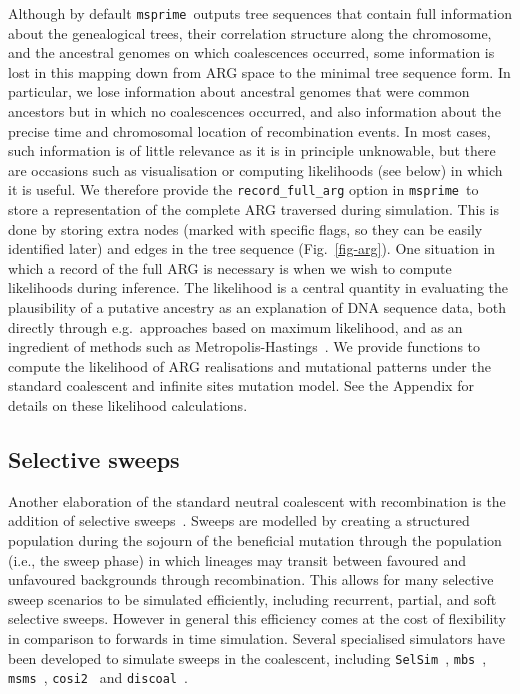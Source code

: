 \documentclass{article}
\newcommand{\msprime}[0]{\texttt{msprime}}
\newcommand{\msms}[0]{\texttt{msms}}
\newcommand{\cosiTwo}[0]{\texttt{cosi2}}
\newcommand{\discoal}[0]{\texttt{discoal}}
\begin{document}
Although by default \msprime\ outputs tree sequences that contain full information
about the genealogical trees, their correlation structure along the chromosome,
and the ancestral genomes on which coalescences occurred, some information
is lost in this mapping down from ARG space to the minimal tree sequence
form. In particular, we lose
information about ancestral genomes that were common ancestors but
in which no coalescences occurred, and also information about the precise time
and chromosomal location of recombination events. In most cases, such
information is of little relevance as it is in principle unknowable,
but there are occasions such as visualisation or computing likelihoods (see
below) in which it is useful. We therefore provide
the \texttt{record\_full\_arg} option in \msprime\
to store a representation of the complete ARG traversed during simulation.
This is done by storing extra nodes (marked with specific flags, so they
can be easily identified later) and edges in the tree sequence
(Fig.~\ref{fig-arg}).
One situation in which a record of the full ARG is necessary is when we
wish to compute likelihoods during inference.
The likelihood is a central quantity in evaluating the plausibility of a putative
ancestry as an explanation of DNA sequence data, both directly through
e.g.~approaches based on maximum likelihood, and as an ingredient of
methods such as
Metropolis-Hastings~\citep{kuhner2000maximum,nielsen2000estimation,wang2008bayesian}.
We provide functions to compute the likelihood of ARG realisations
and mutational patterns under
the standard coalescent and infinite sites mutation model.
See the Appendix for details on these likelihood calculations.

\subsection*{Selective sweeps}
\label{sec-selection}
Another elaboration of the standard neutral coalescent with recombination
is the addition of selective
sweeps~\citep{kaplan1989hitchhiking,braverman1995hitchhiking,kim2002detecting}.
Sweeps are modelled by creating a structured population
during the sojourn of the beneficial mutation through the population (i.e., the sweep phase)
in which lineages may transit between favoured and unfavoured backgrounds through
recombination. This allows for many selective sweep scenarios to be simulated
efficiently, including recurrent, partial, and soft selective sweeps.
However in general this
efficiency comes at the cost of flexibility in comparison to forwards in
time simulation.
Several specialised simulators have been developed to simulate
sweeps in the coalescent,
including \texttt{SelSim}~\citep{spencer2004selsim},
\texttt{mbs}~\citep{teshima2009mbs}, \msms~\citep{ewing2010msms},
\cosiTwo~\citep{shlyakhter2014cosi2}
and \discoal~\citep{kern2016discoal}.
\end{document}
